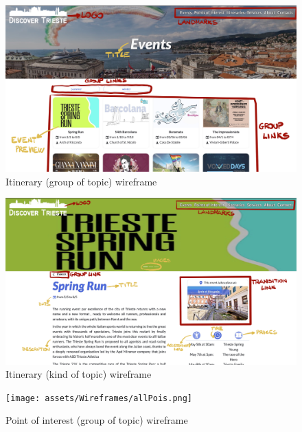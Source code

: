 \documentclass[table, 12pt]{article}
\begin{document}
\begin{figure}[H]
    \begin{center}
        \includegraphics[width=\textwidth]{assets/Wireframes/allEvents.png}
        \caption{Itinerary (group of topic) wireframe}
    \end{center}
\end{figure}

\begin{figure}[H]
    \begin{center}
        \includegraphics[width=\textwidth]{assets/Wireframes/event.png}
        \caption{Itinerary (kind of topic) wireframe}
    \end{center}
\end{figure}

\begin{figure}[H]
    \begin{center}
        \texttt{[image: assets/Wireframes/allPois.png]}
        \caption{Point of interest (group of topic) wireframe}
    \end{center}
\end{figure}
\end{document}
